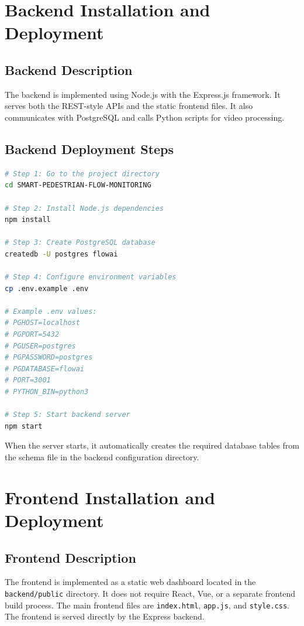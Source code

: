 \documentclass[12pt,a4paper]{report}
\begin{document}
\section{Backend Installation and Deployment}

\subsection{Backend Description}

The backend is implemented using Node.js with the Express.js framework. It serves both the REST-style APIs and the static frontend files. It also communicates with PostgreSQL and calls Python scripts for video processing.

\subsection{Backend Deployment Steps}

\begin{lstlisting}[language=bash]
# Step 1: Go to the project directory
cd SMART-PEDESTRIAN-FLOW-MONITORING

# Step 2: Install Node.js dependencies
npm install

# Step 3: Create PostgreSQL database
createdb -U postgres flowai

# Step 4: Configure environment variables
cp .env.example .env

# Example .env values:
# PGHOST=localhost
# PGPORT=5432
# PGUSER=postgres
# PGPASSWORD=postgres
# PGDATABASE=flowai
# PORT=3001
# PYTHON_BIN=python3

# Step 5: Start backend server
npm start
\end{lstlisting}

When the server starts, it automatically creates the required database tables from the schema file in the backend configuration directory.

\section{Frontend Installation and Deployment}

\subsection{Frontend Description}

The frontend is implemented as a static web dashboard located in the \texttt{backend/public} directory. It does not require React, Vue, or a separate frontend build process. The main frontend files are \texttt{index.html}, \texttt{app.js}, and \texttt{style.css}. The frontend is served directly by the Express backend.
\end{document}
